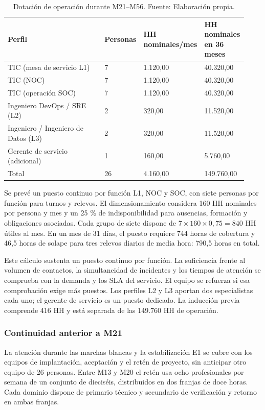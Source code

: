 \documentclass[11pt]{article}
\begin{document}
\begingroup
\small
\begin{longtable}{@{}p{0.48\linewidth}p{0.1\linewidth}p{0.17\linewidth}p{0.18\linewidth}@{}}
\caption[Dotación de operación durante M21--M56]{Dotación de operación durante M21--M56. Fuente: Elaboración propia.}\label{tab:t15-11}\\
\toprule
\textbf{Perfil} & \textbf{Personas} & \textbf{HH nominales/mes} & \textbf{HH nominales en 36 meses} \\
\midrule
\endhead
\bottomrule
\endlastfoot
TIC (mesa de servicio L1) & 7 & 1.120,00 & 40.320,00 \\
TIC (NOC) & 7 & 1.120,00 & 40.320,00 \\
TIC (operación SOC) & 7 & 1.120,00 & 40.320,00 \\
Ingeniero DevOps / SRE (L2) & 2 & 320,00 & 11.520,00 \\
Ingeniero / Ingeniero de Datos (L3) & 2 & 320,00 & 11.520,00 \\
Gerente de servicio (adicional) & 1 & 160,00 & 5.760,00 \\
Total & 26 & 4.160,00 & 149.760,00 \\
\end{longtable}
\endgroup

Se prevé un puesto continuo por función L1, NOC y SOC, con siete personas por función para turnos y relevos. El dimensionamiento considera 160 HH nominales por persona y mes y un 25 \% de indisponibilidad para ausencias, formación y obligaciones asociadas. Cada grupo de siete dispone de $7\times160\times0{,}75=840$ HH útiles al mes. En un mes de 31 días, el puesto requiere 744 horas de cobertura y 46,5 horas de solape para tres relevos diarios de media hora: 790,5 horas en total.

Este cálculo sustenta un puesto continuo por función. La suficiencia frente al volumen de contactos, la simultaneidad de incidentes y los tiempos de atención se comprueba con la demanda y los SLA del servicio. El equipo se refuerza si esa comprobación exige más puestos. Los perfiles L2 y L3 aportan dos especialistas cada uno; el gerente de servicio es un puesto dedicado. La inducción previa comprende 416 HH y está separada de las 149.760 HH de operación.

\subsubsection{Continuidad anterior a M21}

La atención durante las marchas blancas y la estabilización E1 se cubre con los equipos de implantación, aceptación y el retén de proyecto, sin anticipar otro equipo de 26 personas. Entre M13 y M20 el retén usa ocho profesionales por semana de un conjunto de dieciséis, distribuidos en dos franjas de doce horas. Cada dominio dispone de primario técnico y secundario de verificación y retorno en ambas franjas.
\end{document}
